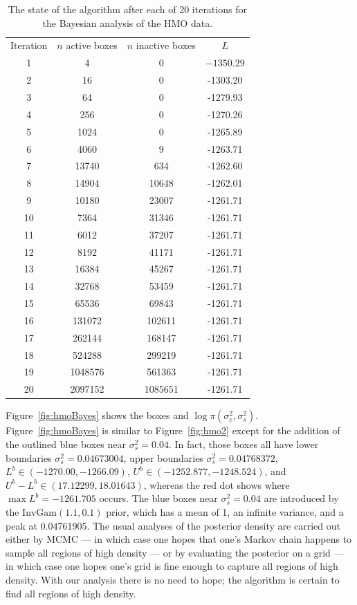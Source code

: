 \documentclass{report}
\newcommand{\IG}{\text{InvGam}}
\newcommand{\sigssq}{\sigma_s^2}
\newcommand{\sigesq}{\sigma_e^2}
\begin{document}
\begin{table}[H]
\centering
\begin{tabular}{|c|c|c|c|}
\hline
Iteration & $n$ active boxes & $n$ inactive boxes & $L$\\
1 & 4 & 0 & $-1350.29$\\
2 & 16 & 0 & -1303.20\\
3 & 64 & 0 & -1279.93\\
4 & 256 & 0 & -1270.26\\
5 & 1024 & 0 & -1265.89\\
6 & 4060 & 9 & -1263.71\\
7 & 13740 & 634 & -1262.60\\
8 & 14904 & 10648 & -1262.01\\
9 & 10180 & 23007 & -1261.71\\
10 & 7364 & 31346 & -1261.71\\
11 & 6012 & 37207 & -1261.71\\
12 & 8192 & 41171 & -1261.71\\
13 & 16384 & 45267 & -1261.71\\
14 & 32768 & 53459 & -1261.71\\
15 & 65536 & 69843 & -1261.71\\
16 & 131072 & 102611 & -1261.71\\
17 & 262144 & 168147 & -1261.71\\
18 & 524288 & 299219 & -1261.71\\
19 & 1048576 & 561363 & -1261.71\\
20 & 2097152 & 1085651 & -1261.71\\
\hline
\end{tabular}
\caption{The state of the algorithm after each of 20 iterations for the Bayesian analysis of the HMO data.}
\label{table:hmo_HH11Bayes}
\end{table}

Figure~\ref{fig:hmoBayes} shows the boxes and $\log \pi(\sigesq,\sigssq)$.  Figure~\ref{fig:hmoBayes} is similar to Figure~\ref{fig:hmo2} except for the addition of the outlined blue boxes near $\sigssq = 0.04$.  In fact, those boxes all have lower boundaries $\sigssq = 0.04673004$, upper boundaries $\sigssq = 0.04768372$, $L^b \in (-1270.00, -1266.09)$, $U^b \in (-1252.877, -1248.524)$, and $U^b-L^b \in (17.12299, 18.01643)$, whereas the red dot shows where $\max L^b = -1261.705$ occurs.  The blue boxes near $\sigssq = 0.04$ are introduced by the $\IG(1.1,0.1)$ prior, which has a mean of 1, an infinite variance, and a peak at 0.04761905.  The usual analyses of the posterior density are carried out either by MCMC --- in which case one hopes that one's Markov chain happens to sample all regions of high density --- or by evaluating the posterior on a grid --- in which case one hopes one's grid is fine enough to capture all regions of high density.  With our analysis there is no need to hope; the algorithm is certain to find all regions of high density.
\end{document}
